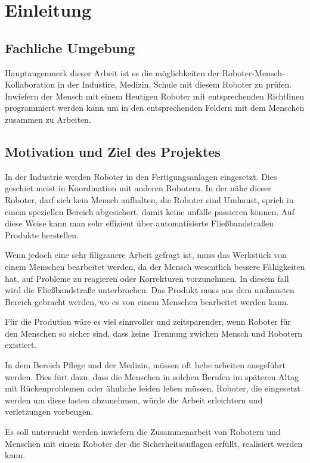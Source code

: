 \chapter{Einleitung}
\label{einleitung}

\section{Fachliche Umgebung}
\label{fachliche_domaene}

Hauptaugenmerk dieser Arbeit ist es die möglichkeiten der Roboter-Mensch-Kollaboration
in der Industire, Medizin, Schule mit diesem Roboter zu prüfen.
Inwiefern der Mensch mit einem Heutigen Roboter mit entsprechenden Richtlinen programmiert werden kann um in den entsprechenden Feldern mit dem Menschen zusammen zu Arbeiten.

\section{Motivation und Ziel des Projektes}
\label{projektziel_motivation}

In der Industrie werden Roboter in den Fertigungsanlagen eingesetzt. 
Dies geschiet meist in Koordination mit anderen Robotern. In der nähe dieser Roboter, darf sich kein Mensch aufhalten, die Roboter sind Umhaust, sprich in einem speziellen Bereich abgesichert, damit keine unfälle passieren können. 
Auf diese Weise kann man sehr effizient über automatisierte Fließbandstraßen Produkte herstellen.

Wenn jedoch eine sehr filigranere Arbeit gefragt ist, muss das Werkstück von einem Menschen bearbeitet werden, da der Mensch wesentlich bessere Fähigkeiten hat, auf Probleme zu reagieren oder Korrekturen vorzunehmen. In diesem fall wird die Fließbandstraße unterbrochen. Das Produkt muss aus dem umhausten Bereich gebracht werden, wo es von einem Menschen bearbeitet werden kann.

Für die Prodution wäre es viel sinnvoller und zeitsparender, wenn Roboter für den Menschen so sicher sind, dass keine Trennung zwichen Mensch und Robotern existiert.

In dem Bereich Pflege und der Medizin, müssen oft hebe arbeiten ausgeführt werden. Dies fürt dazu, dass die Menschen in solchen Berufen im späteren Altag mit Rückenproblemen oder ähnliche leiden leben müssen. Roboter, die eingesetzt werden um diese lasten abzunehmen, würde die Arbeit erleichtern und verletzungen vorbeugen.

Es soll untersucht werden inwiefern die Zusammenarbeit von Robotern und Menschen mit einem Roboter der die Sicherheitsauflagen erfüllt, realisiert werden kann.

